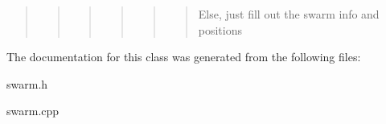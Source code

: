 \begin{quote}
\begin{quote}
\begin{quote}
\begin{quote}
\begin{quote}
\begin{quote}
Else, just fill out the swarm info and positions\end{quote}
\end{quote}
\end{quote}
\end{quote}
\end{quote}
\end{quote}


The documentation for this class was generated from the following files\+:\begin{DoxyCompactItemize}
\item 
swarm.\+h\item 
swarm.\+cpp\end{DoxyCompactItemize}
